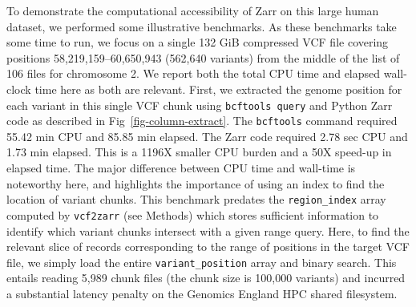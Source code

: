 \documentclass[a4paper,num-refs]{oup-contemporary}
\begin{document}
To demonstrate the computational accessibility of Zarr on this
large human dataset, we performed some illustrative benchmarks.
As these benchmarks take some time to run, we focus
on a single 132 GiB compressed VCF file covering
positions 58,219,159--60,650,943 (562,640 variants)
from the middle of the list of 106 files for chromosome 2.
We report both the total CPU time and elapsed wall-clock time here
as both are relevant.
First, we extracted the genome position for each variant in this single VCF
chunk using \texttt{bcftools query} and Python Zarr code as described in
Fig~\ref{fig-column-extract}. The \texttt{bcftools} command required
55.42 min CPU and 85.85 min elapsed.
The Zarr code required 2.78 sec CPU and 1.73 min elapsed.
This is a 1196X smaller CPU burden and a 50X speed-up in elapsed time.
The major difference between CPU time and wall-time is noteworthy
here, and highlights the importance of using an index to find
the location of variant chunks.
This benchmark predates the \texttt{region\_index}
array computed by \texttt{vcf2zarr} (see Methods) which 
stores sufficient information to identify which variant chunks intersect
with a given range query.
Here, to find the relevant slice
of records corresponding to the range of positions in the target
VCF file, we simply load the entire \texttt{variant\_position} array and
binary search. This entails reading 5,989 chunk files
(the chunk size is 100,000 variants) and incurred a substantial
latency penalty on the Genomics England HPC shared filesystem. 

\end{document}
